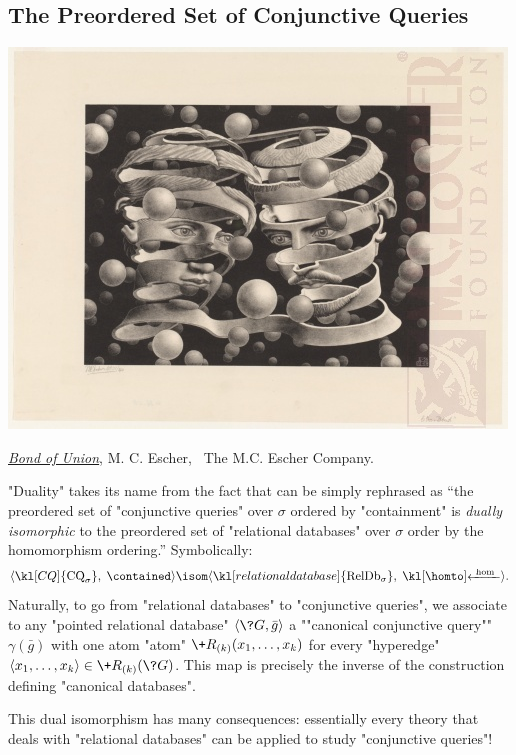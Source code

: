 \subsection{The Preordered Set of Conjunctive Queries}
\label{sec:prelim-db-poset-cq}

\begin{marginfigure}
	\centering
	\includegraphics[width=\linewidth]{fig/escher/bound-of-union.jpg}
	\caption{\href{https://mcescher.com/gallery/most-popular/\#iLightbox[gallery\_image\_1]/23}{\emph{Bond of Union}}, M. C. Escher, \textcopyright~The M.C. Escher Company.}
\end{marginfigure}
"Duality" takes its name from the fact that  can be simply rephrased as
``the preordered set of "conjunctive queries" over $\sigma$ ordered by
"containment" is \emph{dually isomorphic} to the preordered set of "relational databases"
over $\sigma$  order by the homomorphism ordering.'' Symbolically: 
\[
	\tup{\kl[CQ]{\textrm{CQ}_\sigma},\; \contained }
	\isom
	\tup{\kl[relational database]{\textrm{RelDb}_\sigma},\; \cohomto }.
\]
Naturally, to go from "relational databases" to "conjunctive queries",
we associate to any "pointed relational database" $\tup{\?G, \bar g}$
a ""canonical conjunctive query"" $\gamma(\bar g)$ with one atom "atom"
$\+R_{(k)}(x_1,\hdots,x_k)$ for every "hyperedge" $\tup{x_1,\hdots,x_k} \in \+R_{(k)}(\?G)$.
This map is precisely the inverse of the construction defining "canonical databases".

This dual isomorphism has many consequences: essentially every theory that deals with
"relational databases" can be applied to study "conjunctive queries"!

